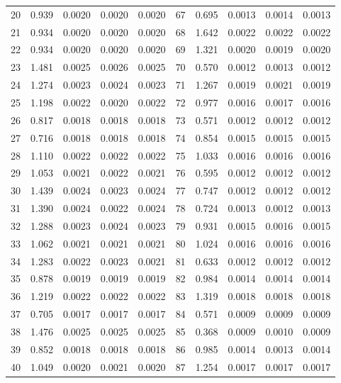 \documentclass[12pt, leqno]{article}
\begin{document}
\begin{table}[ht]
{\begin{tabular}{r|r|r|r|r|r|r|r|r|r}
  20 & 0.939 & 0.0020 & 0.0020 & 0.0020 & 67 & 0.695 & 0.0013 & 0.0014 & 0.0013 \\ 
  21 & 0.934 & 0.0020 & 0.0020 & 0.0020 & 68 & 1.642 & 0.0022 & 0.0022 & 0.0022 \\ 
  22 & 0.934 & 0.0020 & 0.0020 & 0.0020 & 69 & 1.321 & 0.0020 & 0.0019 & 0.0020 \\ 
  23 & 1.481 & 0.0025 & 0.0026 & 0.0025 & 70 & 0.570 & 0.0012 & 0.0013 & 0.0012 \\ 
  24 & 1.274 & 0.0023 & 0.0024 & 0.0023 & 71 & 1.267 & 0.0019 & 0.0021 & 0.0019 \\ 
  25 & 1.198 & 0.0022 & 0.0020 & 0.0022 & 72 & 0.977 & 0.0016 & 0.0017 & 0.0016 \\ 
  26 & 0.817 & 0.0018 & 0.0018 & 0.0018 & 73 & 0.571 & 0.0012 & 0.0012 & 0.0012 \\ 
  27 & 0.716 & 0.0018 & 0.0018 & 0.0018 & 74 & 0.854 & 0.0015 & 0.0015 & 0.0015 \\ 
  28 & 1.110 & 0.0022 & 0.0022 & 0.0022 & 75 & 1.033 & 0.0016 & 0.0016 & 0.0016 \\ 
  29 & 1.053 & 0.0021 & 0.0022 & 0.0021 & 76 & 0.595 & 0.0012 & 0.0012 & 0.0012 \\ 
  30 & 1.439 & 0.0024 & 0.0023 & 0.0024 & 77 & 0.747 & 0.0012 & 0.0012 & 0.0012 \\ 
  31 & 1.390 & 0.0024 & 0.0022 & 0.0024 & 78 & 0.724 & 0.0013 & 0.0012 & 0.0013 \\ 
  32 & 1.288 & 0.0023 & 0.0024 & 0.0023 & 79 & 0.931 & 0.0015 & 0.0016 & 0.0015 \\ 
  33 & 1.062 & 0.0021 & 0.0021 & 0.0021 & 80 & 1.024 & 0.0016 & 0.0016 & 0.0016 \\ 
  34 & 1.283 & 0.0022 & 0.0023 & 0.0021 & 81 & 0.633 & 0.0012 & 0.0012 & 0.0012 \\ 
  35 & 0.878 & 0.0019 & 0.0019 & 0.0019 & 82 & 0.984 & 0.0014 & 0.0014 & 0.0014 \\ 
  36 & 1.219 & 0.0022 & 0.0022 & 0.0022 & 83 & 1.319 & 0.0018 & 0.0018 & 0.0018 \\ 
  37 & 0.705 & 0.0017 & 0.0017 & 0.0017 & 84 & 0.571 & 0.0009 & 0.0009 & 0.0009 \\ 
  38 & 1.476 & 0.0025 & 0.0025 & 0.0025 & 85 & 0.368 & 0.0009 & 0.0010 & 0.0009 \\ 
  39 & 0.852 & 0.0018 & 0.0018 & 0.0018 & 86 & 0.985 & 0.0014 & 0.0013 & 0.0014 \\ 
  40 & 1.049 & 0.0020 & 0.0021 & 0.0020 & 87 & 1.254 & 0.0017 & 0.0017 & 0.0017 \\ 

\end{tabular}}
\end{table}
\end{document}
